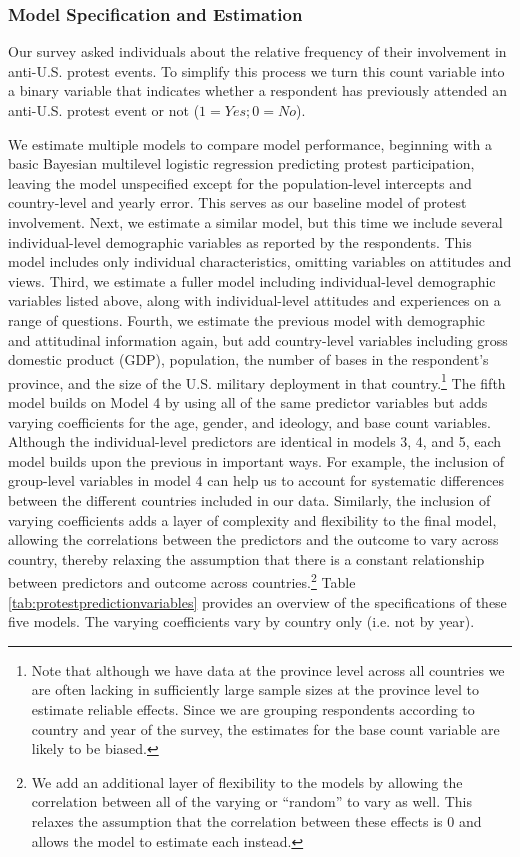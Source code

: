 \subsubsection*{Model Specification and Estimation}


Our survey asked individuals about the relative frequency of their involvement in anti-U.S. protest events. To simplify this process we turn this count variable into a binary variable that indicates whether a respondent has previously attended an anti-U.S. protest event or not ($1 = Yes; 0 = No$). 

We estimate multiple models to compare model performance, beginning with a basic Bayesian multilevel logistic regression predicting protest participation, leaving the model unspecified except for the population-level intercepts and country-level and yearly error. This serves as our baseline model of protest involvement. Next, we estimate a similar model, but this time we include several individual-level demographic variables as reported by the respondents. This model includes only individual characteristics, omitting variables on attitudes and views. Third, we estimate a fuller model including individual-level demographic variables listed above, along with individual-level attitudes and experiences on a range of questions. Fourth, we estimate the previous model with demographic and attitudinal information again, but add country-level variables including gross domestic product (GDP), population, the number of bases in the respondent's province, and the size of the U.S. military deployment in that country.\footnote{Note that although we have data at the province level across all countries we are often lacking in sufficiently large sample sizes at the province level to estimate reliable effects. Since we are grouping respondents according to country and year of the survey, the estimates for the base count variable are likely to be biased.} The fifth model builds on Model 4 by using all of the same predictor variables but adds varying coefficients for the age, gender, and ideology, and base count variables. Although the individual-level predictors are identical in models 3, 4, and 5, each model builds upon the previous in important ways. For example, the inclusion of group-level variables in model 4 can help us to account for systematic differences between the different countries included in our data. Similarly, the inclusion of varying coefficients adds a layer of complexity and flexibility to the final model, allowing the correlations between the predictors and the outcome to vary across country, thereby relaxing the assumption that there is a constant relationship between predictors and outcome across countries.\footnote{We add an additional layer of flexibility to the models by allowing the correlation between all of the varying or ``random'' to vary as well. This relaxes the assumption that the correlation between these effects is 0 and allows the model to estimate each instead.} Table \ref{tab:protestpredictionvariables} provides an overview of the specifications of these five models. The varying coefficients vary by country only (i.e. not by year). 

